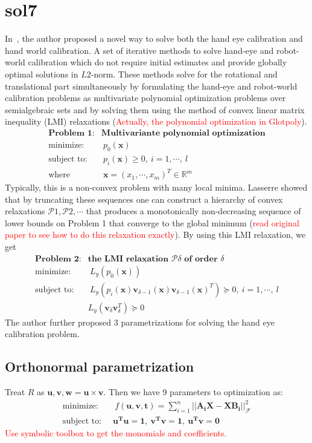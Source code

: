 \section{sol7}
In~\cite{heller2014hand}, the author proposed a novel way to solve both the hand eye calibration and hand world calibration. A set of iterative methods
to solve hand-eye and robot-world calibration which do not require initial estimates and provide globally optimal solutions in $L2$-norm. These methods solve for the rotational and translational part
simultaneously by formulating the hand-eye
and robot-world calibration problems as multivariate polynomial
optimization problems over semialgebraic sets and
by solving them using the method of convex linear matrix
inequality (LMI) relaxations (\textcolor{red}{Actually, the polynomial optimization in Glotpoly}).
\begin{align}
\textbf{Problem 1}:& \textbf{Multivariante polynomial optimization} \\
\text{minimize: }& \ p_0(\mathbf{x}) \\
\text{subject to: }& \ p_i(\mathbf{x}) \geq 0,\ i=1, \cdots,\ l \\
\text{where}& \ \mathbf{x}=(x_1, \cdots, x_m)^T \in \mathbb{R}^m
\end{align}
Typically, this is a non-convex problem with many local
minima. Lasserre
showed that by truncating these sequences one can construct
a hierarchy of convex relaxations $\mathcal{P}1,\mathcal{P}2, \cdots$ that produces
a monotonically non-decreasing sequence of lower bounds
on Problem 1 that converge to the global minimum (\textcolor{red}{read original paper to see how to do this relaxation exactly}). By using this LMI relaxation, we get 
\begin{align}
\textbf{Problem 2}:& \textbf{the LMI relaxation $\mathcal{P}\delta$ of order $\delta$} \\
\text{minimize: }& \ L_y(p_0(\mathbf{x})) \\
\text{subject to: }& \ L_y(p_i(\mathbf{x})\mathbf{v}_{\delta-1}(\mathbf{x})\mathbf{v}_{\delta-1}(\mathbf{x})^T) \succeq 0,\ i=1, \cdots,\ l \\
&  L_y(\mathbf{v}_{\delta}\mathbf{v}_{\delta}^T) \succeq 0
\end{align}
The author further proposed $3$ parametrizations for solving the hand eye calibration problem. 
\subsection{Orthonormal parametrization}
Treat $R$ as $\mathbf{u}, \mathbf{v}, \mathbf{w}=\mathbf{u} \times \mathbf{v}$. Then we have 9 parameters to optimization as:
\begin{align}
\text{minimize: }\ &\ f(\mathbf{u, v, t})=\sum_{i=1}^{n} 
||\mathbf{A_iX-XB_i}||_{\mathcal{F}}^2 \\
\text{subject to: }\ & \mathbf{u^Tu=1},\ \mathbf{v^Tv=1},\ \mathbf{u^Tv=0}
\end{align}
\textcolor{red}{Use symbolic toolbox to get the monomials and coefficients.}
